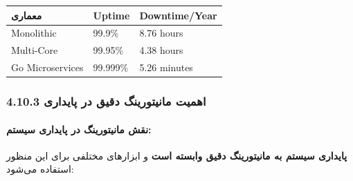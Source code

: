 \documentclass[
]{article}
\newcounter{none} %
\begin{document}
{\def\LTcaptype{none} %
\begin{longtable}[]{@{}lll@{}}
\toprule\noalign{}
معماری & Uptime & Downtime/Year \\
\midrule\noalign{}
\endhead
\bottomrule\noalign{}
\endlastfoot
Monolithic & 99.9\% & 8.76 hours \\
Multi-Core & 99.95\% & 4.38 hours \\
Go Microservices & 99.999\% & 5.26 minutes \\
\end{longtable}
}

\subsubsection{4.10.3 اهمیت مانیتورینگ دقیق در
پایداری}\label{ux627ux647ux645ux6ccux62a-ux645ux627ux646ux6ccux62aux648ux631ux6ccux646ux6af-ux62fux642ux6ccux642-ux62fux631-ux67eux627ux6ccux62fux627ux631ux6cc}

\paragraph{نقش مانیتورینگ در پایداری
سیستم:}\label{ux646ux642ux634-ux645ux627ux646ux6ccux62aux648ux631ux6ccux646ux6af-ux62fux631-ux67eux627ux6ccux62fux627ux631ux6cc-ux633ux6ccux633ux62aux645}

\textbf{پایداری سیستم به مانیتورینگ دقیق وابسته است} و ابزارهای مختلفی
برای این منظور استفاده می‌شود:
\end{document}
